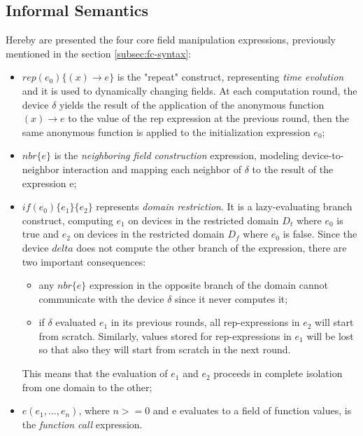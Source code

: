 \subsection{Informal Semantics}
\label{subsec:fc-semantics}
Hereby are presented the four core field manipulation expressions, previously mentioned in the section \ref{subsec:fc-syntax}:

\begin{itemize}
    \item $rep(e_0)\{(x) \rightarrow e\}$ is the "repeat" construct, representing \textit{time evolution} and it is used to dynamically changing fields. At each computation round,
          the device $\delta$ yields the result of the application of the anonymous function $(x) \rightarrow e$ to the value of the rep expression at the previous round, then the same anonymous function is
          applied to the initialization expression $e_0$;
    \item $nbr\{e\}$ is the \textit{neighboring field construction} expression, modeling device-to-neighbor interaction and mapping each neighbor of $\delta$ to the result of the expression e;
    \item $if(e_0)\{e_1\}\{e_2\}$ represents \textit{domain restriction}. It is a lazy-evaluating branch construct, computing $e_1$ on devices in the restricted domain $D_t$ where $e_0$ is true and $e_2$ on devices in the restricted domain $D_f$ where $e_0$ is false.
          Since the device $delta$ does not compute the other branch of the expression, there are two important consequences:
          \begin{itemize}
              \item any $nbr\{e\}$ expression in the opposite branch of the domain cannot communicate with the device $\delta$ since it never computes it;
              \item if $\delta$ evaluated $e_1$ in its previous rounds, all rep-expressions in $e_2$ will start from scratch.
                    Similarly, values stored for rep-expressions in $e_1$ will be lost so that also they will start from scratch in the next round.
          \end{itemize}
          This means that the evaluation of $e_1$ and $e_2$ proceeds in complete isolation from one domain to the other;
    \item $e(e_1, ..., e_n)$, where $n>=0$ and e evaluates to a field of function values, is the \textit{function call} expression.
\end{itemize}



